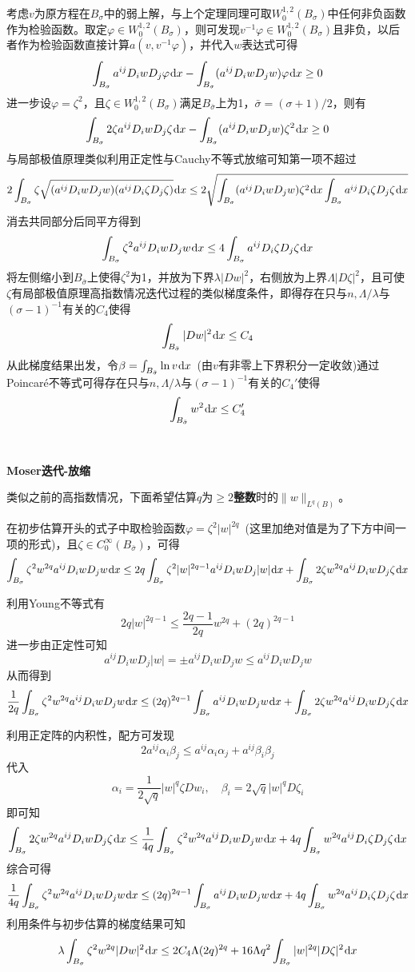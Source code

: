 \documentclass[a4paper,UTF8,fontset=windows,AutoFakeBold]{ctexart}
\newcommand*{\dr}{\hspace{0.07em}\mathrm{d}}
\begin{document}
{    考虑$v$为原方程在$B_\sigma$中的弱上解，与上个定理同理可取$W_0^{1,2}(B_\sigma)$中任何非负函数作为检验函数。取定$\varphi\in W_0^{1,2}(B_\sigma)$，则可发现$v^{-1}\varphi\in W_0^{1,2}(B_\sigma)$且非负，以后者作为检验函数直接计算$a(v,v^{-1}\varphi)$，并代入$w$表达式可得
    $$\int_{B_\sigma}a^{ij}D_iwD_j\varphi\dr x-\int_{B_\sigma}(a^{ij}D_iwD_jw)\varphi\dr x\ge0$$
    进一步设$\varphi=\zeta^2$，且$\zeta\in W_0^{1,2}(B_\sigma)$满足$B_{\bar\sigma}$上为1，$\bar\sigma=(\sigma+1)/2$，则有
    $$\int_{B_\sigma}2\zeta a^{ij}D_iwD_j\zeta\dr x-\int_{B_\sigma}(a^{ij}D_iwD_jw)\zeta^2\dr x\ge0$$
    与局部极值原理类似利用正定性与Cauchy不等式放缩可知第一项不超过
    $$2\int_{B_\sigma}\zeta\sqrt{(a^{ij}D_iwD_jw)(a^{ij}D_i\zeta D_j\zeta)}\dr x\le2\sqrt{\int_{B_\sigma}(a^{ij}D_iwD_jw)\zeta^2\dr x\int_{B_\sigma}a^{ij}D_i\zeta D_j\zeta\dr x}$$
    消去共同部分后同平方得到
    $$\int_{B_\sigma}\zeta^2a^{ij}D_iwD_jw\dr x\le 4\int_{B_\sigma}a^{ij}D_i\zeta D_j\zeta\dr x$$
    将左侧缩小到$B_{\bar\sigma}$上使得$\zeta^2$为1，并放为下界$\lambda|Dw|^2$，右侧放为上界$\Lambda|D\zeta|^2$，且可使$\zeta$有局部极值原理高指数情况迭代过程的类似梯度条件，即得存在只与$n,\Lambda/\lambda$与$(\sigma-1)^{-1}$有关的$C_4$使得
    $$\int_{B_{\bar\sigma}}|Dw|^2\dr x\le C_4$$
    从此梯度结果出发，令$\beta=\int_{B_{\bar\sigma}}\ln v\dr x$\ (由$v$有非零上下界积分一定收敛)通过Poincar\'e不等式可得存在只与$n,\Lambda/\lambda$与$(\sigma-1)^{-1}$有关的$C_4'$使得
    $$\int_{B_{\bar\sigma}}w^2\dr x\le C_4'$$

    \
    
    \textbf{Moser迭代-放缩}

    类似之前的高指数情况，下面希望估算$q$为$\ge2$\textbf{整数}时的$\|w\|_{L^q(B)}$。

    在初步估算开头的式子中取检验函数$\varphi=\zeta^2|w|^{2q}$\ (这里加绝对值是为了下方中间一项的形式)，且$\zeta\in C_0^\infty(B_{\bar\sigma})$，可得
    $$\int_{B_\sigma}\zeta^2w^{2q}a^{ij}D_iwD_jw\dr x\le2q\int_{B_\sigma}\zeta^2|w|^{2q-1}a^{ij}D_iwD_j|w|\dr x+\int_{B_\sigma}2\zeta w^{2q}a^{ij}D_iwD_j\zeta\dr x$$

    利用Young不等式有
    $$2q|w|^{2q-1}\le\frac{2q-1}{2q}w^{2q}+(2q)^{2q-1}$$
    进一步由正定性可知
    $$a^{ij}D_iwD_j|w|=\pm a^{ij}D_iwD_jw\le a^{ij}D_iwD_jw$$
    从而得到
    $$\frac{1}{2q}\int_{B_\sigma}\zeta^2w^{2q}a^{ij}D_iwD_jw\dr x\le(2q)^{2q-1}\int_{B_\sigma}a^{ij}D_iwD_jw\dr x+\int_{B_\sigma}2\zeta w^{2q}a^{ij}D_iwD_j\zeta\dr x$$

    利用正定阵的内积性，配方可发现
    $$2a^{ij}\alpha_i\beta_j\le a^{ij}\alpha_i\alpha_j+a^{ij}\beta_i\beta_j$$
    代入
    $$\alpha_i=\frac{1}{2\sqrt{q}}|w|^q\zeta Dw_i,\quad\beta_i=2\sqrt{q}|w|^qD\zeta_i$$
    即可知
    $$\int_{B_\sigma}2\zeta w^{2q}a^{ij}D_iwD_j\zeta\dr x\le\frac{1}{4q}\int_{B_\sigma}\zeta^2w^{2q}a^{ij}D_iwD_jw\dr x+4q\int_{B_\sigma}w^{2q}a^{ij}D_i\zeta D_j\zeta\dr x$$
    综合可得
    $$\frac{1}{4q}\int_{B_\sigma}\zeta^2w^{2q}a^{ij}D_iwD_jw\dr x\le(2q)^{2q-1}\int_{B_\sigma}a^{ij}D_iwD_jw\dr x+4q\int_{B_\sigma}w^{2q}a^{ij}D_i\zeta D_j\zeta\dr x$$
    利用条件与初步估算的梯度结果可知
    $$\lambda\int_{B_\sigma}\zeta^2w^{2q}|Dw|^2\dr x\le 2C_4\Lambda(2q)^{2q}+16\Lambda q^2\int_{B_\sigma}|w|^{2q}|D\zeta|^2\dr x$$

}
\end{document}

